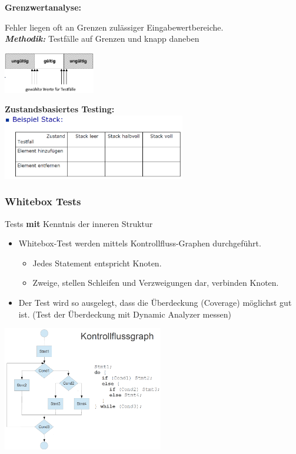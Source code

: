 \textbf{Grenzwertanalyse:} \\
\begin{minipage}{10cm}
Fehler liegen oft an Grenzen zulässiger Eingabewertbereiche. \\
\textit{\textbf{Methodik:}} Testfälle auf Grenzen und knapp daneben \\
\vspace{2cm}
\end{minipage}
\begin{minipage}{4cm}
	\includegraphics[width=4cm]{images/grenzwertanalyse.png}
\end{minipage}

\textbf{Zustandsbasiertes Testing:} \\
\includegraphics[width = 8cm]{images/stack}
\clearpage
\pagebreak
\subsubsection{Whitebox Tests}
\begin{minipage}{8cm}
Tests \textbf{mit} Kenntnis der inneren Struktur\\

\begin{itemize}
\item Whitebox-Test werden mittels Kontrollfluss-Graphen durchgeführt.
\begin{itemize}
	\item Jedes Statement entspricht Knoten.
	\item Zweige, stellen Schleifen und Verzweigungen dar, verbinden Knoten.
\end{itemize}
\item Der Test wird so ausgelegt, dass die Überdeckung (Coverage) möglichst gut ist. (Test der Überdeckung mit Dynamic Analyzer messen)
\end{itemize}
\end{minipage}
\begin{minipage}{7cm}
	\includegraphics[width=7cm]{images/kontrollflussgraphen.png}
\end{minipage}

